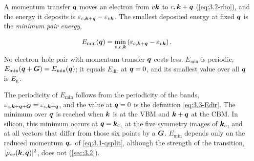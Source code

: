 A momentum transfer $\bm{q}$ moves an electron from $v\bm{k}$ to $c,\bm{k}+\bm{q}$ (\cref{eq:3.2-rho}), and the energy it deposits is $\varepsilon_{c,\bm{k}+\bm{q}} - \varepsilon_{v\bm{k}}$. The smallest deposited energy at fixed $\bm{q}$ is the \emph{minimum pair energy},
\begin{keyresult}
\begin{equation}
  E_{\mathrm{min}}(\bm{q}) = \min_{v,c,\bm{k}}\left(\varepsilon_{c,\bm{k}+\bm{q}} - \varepsilon_{v\bm{k}}\right) .
  \label{eq:3.3-Emin}
\end{equation}
No electron--hole pair with momentum transfer $\bm{q}$ costs less. $E_{\mathrm{min}}$ is periodic, $E_{\mathrm{min}}(\bm{q} + \bm{G}) = E_{\mathrm{min}}(\bm{q})$; it equals $E_{\mathrm{dir}}$ at $\bm{q} = 0$, and its smallest value over all $\bm{q}$ is $E_{\mathrm{g}}$.
\end{keyresult}
The periodicity of $E_{\mathrm{min}}$ follows from the periodicity of the bands, $\varepsilon_{c,\bm{k}+\bm{q}+\bm{G}} = \varepsilon_{c,\bm{k}+\bm{q}}$, and the value at $\bm{q} = 0$ is the definition \cref{eq:3.3-Edir}. The minimum over $\bm{q}$ is reached when $\bm{k}$ is at the VBM and $\bm{k}+\bm{q}$ at the CBM. In silicon, this minimum occurs at $\bm{q} = \bm{k}_{\mathrm{c}}$, at the five symmetry images of $\bm{k}_{\mathrm{c}}$, and at all vectors that differ from those six points by a $\bm{G}$. $E_{\mathrm{min}}$ depends only on the reduced momentum $\bm{q}_r$ of \cref{eq:3.1-qsplit}, although the strength of the transition, $|\rho_{cv}(\bm{k},\bm{q})|^2$, does not (\cref{sec:3.2}).

